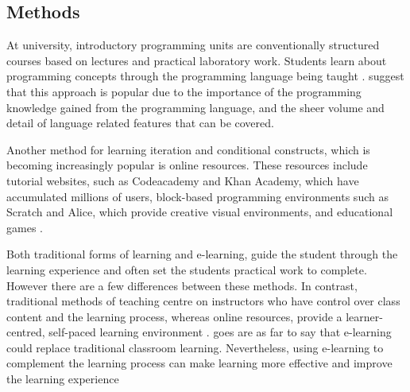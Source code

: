 \documentclass[a4paper,11.5pt]{report}
\numberwithin{figure}{section}
\numberwithin{table}{section}
\numberwithin{equation}{section}
\numberwithin{equation}{section}
\begin{document}
\subsection{Methods}

At university, introductory programming units are conventionally structured courses based on lectures and practical laboratory work. Students learn about programming concepts through the programming language being taught \citep{Robins2003, acm}. \citeauthor{Robins2003} suggest that this approach is popular due to the importance of the programming knowledge gained from the programming language, and the sheer volume and detail of language related features that can be covered.

Another method for learning iteration and conditional constructs, which is becoming increasingly popular is online resources. These resources include tutorial websites, such as Codeacademy and Khan Academy, which have accumulated millions of users, block-based programming environments such as Scratch and Alice, which provide creative visual environments, and educational games \citep{Lee2015}. 

Both traditional forms of learning and e-learning, guide the student through the learning experience and often set the students practical work to complete. However there are a few differences between these methods. In contrast, traditional methods of teaching centre on instructors who have control over class content and the learning process, whereas online resources, provide a learner-centred, self-paced learning environment \citep{Zhang2004}. \citet{Zhang2004} goes are as far to say that e-learning could replace traditional classroom learning. Nevertheless, using e-learning to complement the learning process can make learning more effective and improve the learning experience \citep{Zhang2004, Concannon2005}


\end{document}
